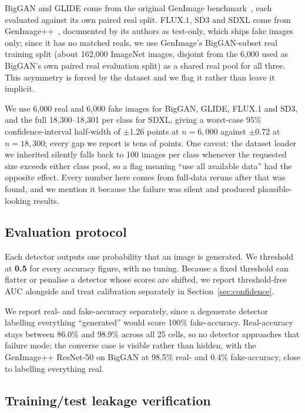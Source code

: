 \documentclass[3p,times,procedia]{elsarticle}
\begin{document}
BigGAN and GLIDE come from the original GenImage
benchmark~\cite{genimage2023}, each evaluated against its own paired real
split. FLUX.1, SD3 and SDXL come from GenImage++~\cite{zhou2025omat},
documented by its authors as test-only, which ships fake images only;
since it has no matched reals, we use GenImage's BigGAN-subset real
training split (about 162{,}000 ImageNet images, disjoint from the 6{,}000
used as BigGAN's own paired real evaluation split) as a shared real pool
for all three. This asymmetry is forced by the dataset and we flag it
rather than leave it implicit.

We use 6{,}000 real and 6{,}000 fake images for BigGAN, GLIDE, FLUX.1 and
SD3, and the full 18{,}300--18{,}301 per class for SDXL, giving a
worst-case 95\% confidence-interval half-width of $\pm$1.26 points at
$n=6{,}000$ against $\pm$0.72 at $n=18{,}300$; every gap we report is tens
of points. One caveat: the dataset loader we inherited silently falls back
to 100 images per class whenever the requested size exceeds either class
pool, so a flag meaning ``use all available data'' had the opposite
effect. Every number here comes from full-data reruns after that was
found, and we mention it because the failure was silent and produced
plausible-looking results.

\subsection{Evaluation protocol}
\label{sec:methods-protocol}

Each detector outputs one probability that an image is generated. We
threshold at \textbf{0.5} for every accuracy figure, with no tuning.
Because a fixed threshold can flatter or penalise a detector whose scores
are shifted, we report threshold-free AUC alongside and treat calibration
separately in Section~\ref{sec:confidence}.

We report real- and fake-accuracy separately, since a degenerate detector
labelling everything ``generated'' would score 100\% fake-accuracy.
Real-accuracy stays between 86.0\% and 98.9\% across all 25 cells, so no
detector approaches that failure mode; the converse case is visible rather
than hidden, with the GenImage++ ResNet-50 on BigGAN at 98.5\% real- and
0.4\% fake-accuracy, close to labelling everything real.

\subsection{Training/test leakage verification}
\label{sec:methods-leakage}
\end{document}
